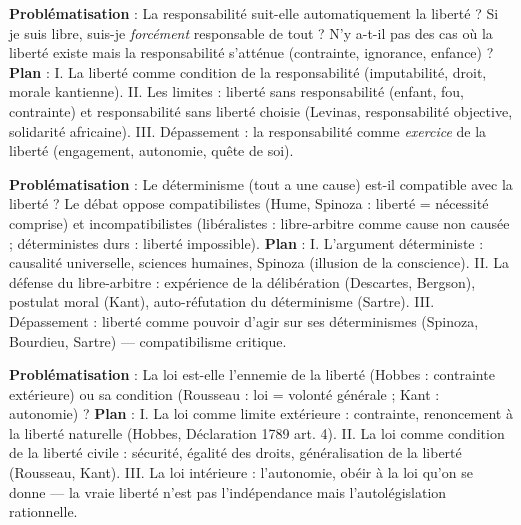 \documentclass[11pt]{article}
\begin{document}
\begin{corrige}
\textbf{Problématisation} : La responsabilité suit-elle automatiquement la liberté ? Si je suis libre, suis-je \emph{forcément} responsable de tout ? N'y a-t-il pas des cas où la liberté existe mais la responsabilité s'atténue (contrainte, ignorance, enfance) ?
\textbf{Plan} :
I. La liberté comme condition de la responsabilité (imputabilité, droit, morale kantienne).
II. Les limites : liberté sans responsabilité (enfant, fou, contrainte) et responsabilité sans liberté choisie (Levinas, responsabilité objective, solidarité africaine).
III. Dépassement : la responsabilité comme \emph{exercice} de la liberté (engagement, autonomie, quête de soi).
\end{corrige}

\begin{corrige}
\textbf{Problématisation} : Le déterminisme (tout a une cause) est-il compatible avec la liberté ? Le débat oppose compatibilistes (Hume, Spinoza : liberté = nécessité comprise) et incompatibilistes (libéralistes : libre-arbitre comme cause non causée ; déterministes durs : liberté impossible).
\textbf{Plan} :
I. L'argument déterministe : causalité universelle, sciences humaines, Spinoza (illusion de la conscience).
II. La défense du libre-arbitre : expérience de la délibération (Descartes, Bergson), postulat moral (Kant), auto-réfutation du déterminisme (Sartre).
III. Dépassement : liberté comme pouvoir d'agir sur ses déterminismes (Spinoza, Bourdieu, Sartre) — compatibilisme critique.
\end{corrige}

\begin{corrige}
\textbf{Problématisation} : La loi est-elle l'ennemie de la liberté (Hobbes : contrainte extérieure) ou sa condition (Rousseau : loi = volonté générale ; Kant : autonomie) ?
\textbf{Plan} :
I. La loi comme limite extérieure : contrainte, renoncement à la liberté naturelle (Hobbes, Déclaration 1789 art. 4).
II. La loi comme condition de la liberté civile : sécurité, égalité des droits, généralisation de la liberté (Rousseau, Kant).
III. La loi intérieure : l'autonomie, obéir à la loi qu'on se donne — la vraie liberté n'est pas l'indépendance mais l'autolégislation rationnelle.
\end{corrige}
\end{document}
